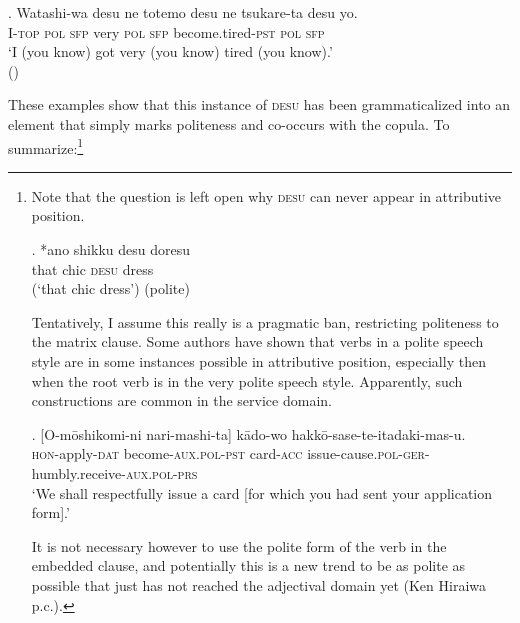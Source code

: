 \documentclass [output=book,colorlinks,citecolor=brown]{langscibook}
\begin{document}
\exg. Watashi-wa desu ne totemo desu ne tsukare-ta desu yo.\\
I-\textsc{top} \textsc{pol} \textsc{sfp} very \textsc{pol} \textsc{sfp} become.tired-\textsc{pst} \textsc{pol} \textsc{sfp}\\
`I (you know) got very (you know) tired (you know).’ \\ \null \hfill (\citealt[Fn. 34]{yamada:2023:looking}) \label{desufinal}

These examples show that this instance of \textsc{desu} has been grammaticalized into an element that simply marks politeness and co-occurs with the copula. To summarize:\footnote{Note that the question is left open why \textsc{desu} can never appear in attributive position.

\par

\exg. *ano shikku desu doresu\\
that chic \textsc{desu} dress\\
(`that chic dress’) (polite)

\par


Tentatively, I assume this really is a pragmatic ban, restricting politeness to the matrix clause. Some authors \citep{horie:2017:attributive} have shown that verbs in a polite speech style are in some instances possible in attributive position, especially then when the root verb is in the very polite speech style. Apparently, such constructions are common in the service domain.

\par

\exg. [O-mōshikomi-ni nari-mashi-ta] kādo-wo hakkō-sase-te-itadaki-mas-u.\\
\textsc{hon}-apply-\textsc{dat} become-\textsc{aux.pol-pst} card-\textsc{acc} issue-cause.\textsc{pol}-\textsc{ger}-humbly.receive-\textsc{aux.pol-prs}\\
`We shall respectfully issue a card [for which you had sent your application form].’ \\ \null \hfill \citep[51]{horie:2017:attributive}

\par


It is not necessary however to use the polite form of the verb in the embedded clause, and potentially this is a new trend to be as polite as possible that just has not reached the adjectival domain yet (Ken Hiraiwa p.c.).}

\end{document}
